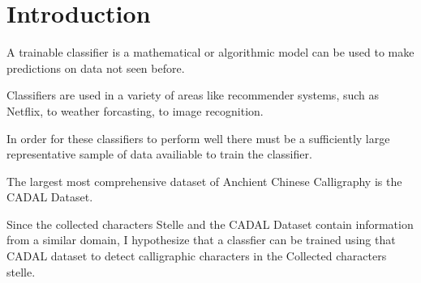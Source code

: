 \chapter{Introduction}

A trainable classifier is a mathematical or algorithmic model can be used to make predictions on data not seen before.

Classifiers are used in a variety of areas like recommender systems, such as Netflix, to weather forcasting, to image recognition.

In order for these classifiers to perform well there must be a sufficiently large representative sample of data availiable to train the classifier.


The largest most comprehensive dataset of Anchient Chinese Calligraphy is the CADAL Dataset.

Since the collected characters Stelle and the CADAL Dataset contain information from a similar domain, I hypothesize that a classfier can be trained using that CADAL dataset to detect calligraphic characters in the Collected characters stelle.
